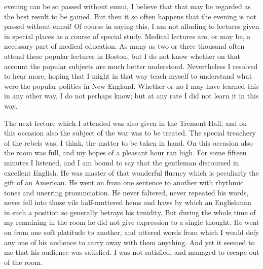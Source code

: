 evening can be so passed without ennui, I believe that that may be
regarded as the best result to be gained.  But then it so often
happens that the evening is not passed without ennui!  Of course in
saying this, I am not alluding to lectures given in special places
as a course of special study.  Medical lectures are, or may be, a
necessary part of medical education.  As many as two or three
thousand often attend these popular lectures in Boston, but I do
not know whether on that account the popular subjects are much
better understood.  Nevertheless I resolved to hear more, hoping
that I might in that way teach myself to understand what were the
popular politics in New England.  Whether or no I may have learned
this in any other way, I do not perhaps know; but at any rate I did
not learn it in this way.

The next lecture which I attended was also given in the Tremont
Hall, and on this occasion also the subject of the war was to be
treated.  The special treachery of the rebels was, I think, the
matter to be taken in hand.  On this occasion also the room was
full, and my hopes of a pleasant hour ran high.  For some fifteen
minutes I listened, and I am bound to say that the gentleman
discoursed in excellent English.  He was master of that wonderful
fluency which is peculiarly the gift of an American.  He went on
from one sentence to another with rhythmic tones and unerring
pronunciation.  He never faltered, never repeated his words, never
fell into those vile half-muttered hems and haws by which an
Englishman in such a position so generally betrays his timidity.
But during the whole time of my remaining in the room he did not
give expression to a single thought.  He went on from one soft
platitude to another, and uttered words from which I would defy any
one of his audience to carry away with them anything.  And yet it
seemed to me that his audience was satisfied.  I was not satisfied,
and managed to escape out of the room.

